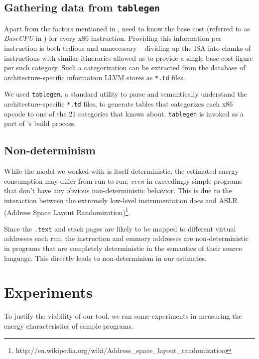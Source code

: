 \subsection{Gathering data from \texttt{tablegen}}

Apart from the factors mentioned in , \wattage need
to know the base cost (referred to as \textit{BaseCPU} in
\cite{steinke}) for every x86 instruction.  Providing this information
per instruction is both tedious and unnecessary -- dividing up the ISA
into chunks of instructions with similar itineraries allowed us to
provide a single base-cost figure per such category.  Such a
categorization can be extracted from the database of
architecture-specific information LLVM stores as \texttt{*.td} files.

We used \texttt{tablegen}, a standard utility to parse and
semantically understand the architecture-specific \texttt{*.td} files,
to generate tables that categorizes each x86 opcode to one of the 21
categories that \wattage knows about.  \texttt{tablegen} is invoked as
a part of \wattage's build process.

\subsection{Non-determinism}

While the model we worked with is itself deterministic, the estimated
energy consumption may differ from run to run; \textit{even} in
exceedingly simple programs that don't have any obvious
non-deterministic behavior.  This is due to the interaction between
the extremely low-level instrumentation \wattage does and ASLR
(Address Space Layout
Randomization)\footnote{http://en.wikipedia.org/wiki/Address\_space\_layout\_randomization}.

Since the \texttt{.text} and stack pages are likely to be mapped to
different virtual addresses each run, the instruction and emmory
addresses are non-deterministic in programs that are completely
deterministic in the semantics of their source language.  This
directly leads to non-determinism in our estimates.

\section{Experiments}

To justify the viability of our tool, we ran some experiments in
measuring the energy characteristics of sample programs.

